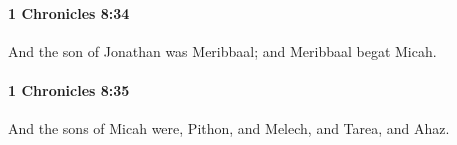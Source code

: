 		\paragraph{1 Chronicles 8:34} %
			\label{1CHRONICLES-8-34}

			And the son of Jonathan was Meribbaal; and Meribbaal begat Micah.


		\paragraph{1 Chronicles 8:35} %
			\label{1CHRONICLES-8-35}

			And the sons of Micah were, Pithon, and Melech, and Tarea, and Ahaz.


